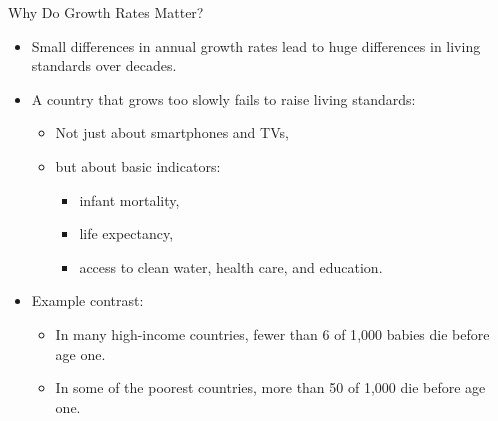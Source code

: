 \documentclass[aspectratio=169]{beamer}
\begin{document}
\begin{frame}{Why Do Growth Rates Matter?}
\transfade
\begin{itemize}[<+->]
  \item Small differences in annual growth rates lead to \alert{huge} differences in living standards over decades.
  \item A country that grows too slowly fails to raise living standards:
  \begin{itemize}[<+->]
    \item Not just about smartphones and TVs,
    \item but about basic indicators:
    \begin{itemize}[<+->]
      \item infant mortality,
      \item life expectancy,
      \item access to clean water, health care, and education.
    \end{itemize}
  \end{itemize}
  \item Example contrast:
  \begin{itemize}[<+->]
    \item In many high-income countries, fewer than 6 of 1{,}000 babies die before age one.
    \item In some of the poorest countries, more than 50 of 1{,}000 die before age one.
  \end{itemize}
\end{itemize}
\end{frame}
\end{document}
